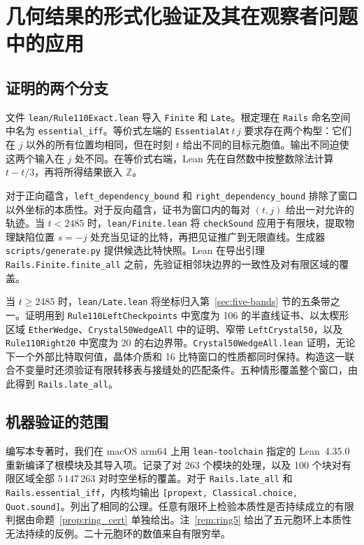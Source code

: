 \section{几何结果的形式化验证及其在观察者问题中的应用}\label{app:lean}

\subsection{证明的两个分支}
文件 \texttt{lean/Rule110Exact.lean} 导入 \texttt{Finite} 和 \texttt{Late}。根定理在 \texttt{Rails} 命名空间中名为 \texttt{essential\_iff}。等价式左端的 \texttt{EssentialAt}\,$t\,j$ 要求存在两个构型：它们在 $j$ 以外的所有位置均相同，但在时刻 $t$ 给出不同的目标元胞值。输出不同迫使这两个输入在 $j$ 处不同。在等价式右端，Lean 先在自然数中按整数除法计算 $t-t/3$，再将所得结果嵌入 $\mathbb Z$。

对于正向蕴含，\texttt{left\_dependency\_bound} 和 \texttt{right\_dependency\_bound} 排除了窗口以外坐标的本质性。对于反向蕴含，证书为窗口内的每对 $(t,j)$ 给出一对允许的轨迹。当 $t<2485$ 时，\texttt{lean/Finite.lean} 将 \texttt{checkSound} 应用于有限块，提取物理缺陷位置 $s=-j$ 处充当见证的比特，再把见证推广到无限直线。生成器 \texttt{scripts/generate.py} 提供候选比特快照。Lean 在导出引理 \texttt{Rails.Finite.finite\_all} 之前，先验证相邻块边界的一致性及对有限区域的覆盖。

当 $t\ge2485$ 时，\texttt{lean/Late.lean} 将坐标归入第~\ref{sec:five-bands} 节的五条带之一。证明用到 \texttt{Rule110LeftCheckpoints} 中宽度为 106 的半直线证书、以太楔形区域 \texttt{EtherWedge}、\texttt{Crystal50WedgeAll} 中的证明、窄带 \texttt{LeftCrystal50}，以及 \texttt{Rule110Right20} 中宽度为 20 的右边界带。\texttt{Crystal50WedgeAll.lean} 证明，无论下一个外部比特取何值，晶体介质和 16 比特窗口的性质都同时保持。构造这一联合不变量时还须验证有限转移表与接缝处的匹配条件。五种情形覆盖整个窗口，由此得到 \texttt{Rails.late\_all}。

\subsection{机器验证的范围}
编写本专著时，我们在 macOS arm64 上用 \texttt{lean-toolchain} 指定的 Lean~4.35.0 重新编译了根模块及其导入项。记录了对 263 个模块的处理，以及 100 个块对有限区域全部 $5\,147\,263$ 对时空坐标的覆盖。对于 \texttt{Rails.late\_all} 和 \texttt{Rails.essential\_iff}，内核均输出 \texttt{[propext, Classical.choice, Quot.sound]}。列出了相同的公理。任意有限环上检验本质性是否持续成立的有限判据由命题~\ref{prop:ring_cert} 单独给出。注~\ref{rem:ring5} 给出了五元胞环上本质性无法持续的反例。二十元胞环的数值来自有限穷举。

